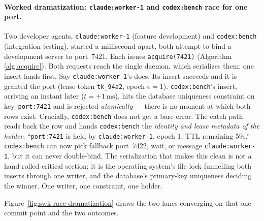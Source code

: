 \documentclass[11pt,a4paper]{article}
\theoremstyle{definition}
\theoremstyle{remark}
\begin{document}
\paragraph{Worked dramatization: \texttt{claude:worker-1} and \texttt{codex:bench} race for one port.}
Two developer agents, \texttt{claude:worker-1} (feature development) and \texttt{codex:bench} (integration testing), started a millisecond apart, both attempt to bind a development server to port~7421. Each issues \texttt{acquire(7421)} (Algorithm \ref{alg:acquire}). Both requests reach the single daemon, which serializes them: one insert lands first. Say \texttt{claude:worker-1}'s does. Its insert succeeds and it is granted the port (lease token \texttt{tk\_94a2}, epoch $e=1$). \texttt{codex:bench}'s insert, arriving an instant later ($t = +1\,\text{ms}$), hits the database uniqueness constraint on key~\texttt{port:7421} and is rejected \emph{atomically} --- there is no moment at which both rows exist. Crucially, \texttt{codex:bench} does not get a bare error. The catch path reads back the row and hands \texttt{codex:bench} the \emph{identity and lease metadata of the holder}: ``\texttt{port:7421} is held by \texttt{claude:worker-1}, epoch 1, TTL remaining 59s.'' \texttt{codex:bench} can now pick fallback port~7422, wait, or message \texttt{claude:worker-1}, but it can never double-bind. The serialization that makes this clean is not a hand-rolled critical section; it is the operating system's file lock funnelling both inserts through one writer, and the database's primary-key uniqueness deciding the winner. One writer, one constraint, one holder.



Figure~\ref{fig:swk-race-dramatization} draws the two lanes converging on that
one commit point and the two outcomes.

\end{document}
